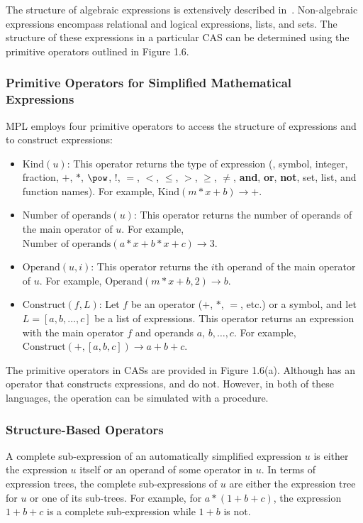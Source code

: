 The structure of algebraic expressions is extensively described in~\cite{cohen2002computer, cohen2003computer}. Non-algebraic expressions encompass relational and logical expressions, lists, and sets. The structure of these expressions in a particular \ac{CAS} can be determined using the primitive operators outlined in Figure 1.6.

\subsubsection{Primitive Operators for Simplified Mathematical Expressions}

\ac{MPL} employs four primitive operators to access the structure of expressions and to construct expressions:
%
\begin{itemize}
  \setlength{\itemsep}{0.0em}
  \item $\text{Kind}(u)$: This operator returns the type of expression (\eg{}, symbol, integer, fraction, $+$, $*$, $\pow$, $!$, $=$, $<$, $\leq$, $>$, $\geq$, $\neq$, \textbf{and}, \textbf{or}, \textbf{not}, set, list, and function names). For example, $\text{Kind}(m*x+b) \rightarrow +$.
  \item $\text{Number of operands}(u)$: This operator returns the number of operands of the main operator of $u$. For example, $\text{Number of operands}(a*x+b*x+c) \rightarrow 3$.
  \item $\text{Operand}(u,i)$: This operator returns the $i$th operand of the main operator of $u$. For example, $\text{Operand}(m*x+b,2) \rightarrow b$.
  \item $\text{Construct}(f,L)$: Let $f$ be an operator ($+$, $*$, $=$, etc.) or a symbol, and let $L = [a, b, \dots, c]$ be a list of expressions. This operator returns an expression with the main operator $f$ and operands $a$, $b, \dots, c$. For example, $\text{Construct}(+, [a, b, c]) \rightarrow a + b + c$.
\end{itemize}

The primitive operators in \acp{CAS} are provided in Figure 1.6(a). Although \Mathematica{} has an operator that constructs expressions, \Maple{} and \MuPAD{} do not. However, in both of these languages, the operation can be simulated with a procedure.

\subsubsection{Structure-Based Operators}

A complete sub-expression of an automatically simplified expression $u$ is either the expression $u$ itself or an operand of some operator in $u$. In terms of expression trees, the complete sub-expressions of $u$ are either the expression tree for $u$ or one of its sub-trees. For example, for $a*(1+b+c)$, the expression $1+b+c$ is a complete sub-expression while $1+b$ is not.

